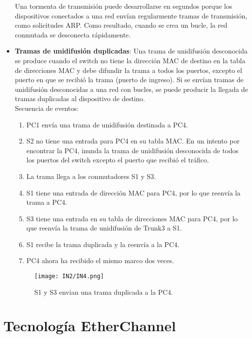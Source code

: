 \documentclass[
	12pt, %
	fleqn, %
	a4paper, %
	oneside, %
]{LegrandOrangeBook}
\begin{document}
\begin{itemize}
Una tormenta de transmisión puede desarrollarse en segundos porque los dispositivos conectados a una red envían regularmente tramas de transmisión, como solicitudes ARP. Como resultado, cuando se crea un bucle, la red conmutada se desconecta rápidamente.
\item \textbf{Tramas de unidifusión duplicadas}: Una trama de unidifusión desconocida se produce  cuando el switch no tiene la dirección MAC de destino en la tabla de direcciones MAC y debe difundir la trama a todos los puertos, excepto el  puerto en que se recibió la trama (puerto de ingreso). Si se envían tramas de unidifusión desconocidas a  una red con bucles, se puede producir la llegada de  tramas duplicadas al dispositivo de destino.\\
Secuencia de eventos:
\begin{enumerate}
\item PC1 envía una trama de unidifusión destinada a PC4.
\item S2 no tiene una entrada para PC4 en su tabla MAC. En un intento por encontrar la PC4, inunda la trama de unidifusión desconocida de todos los puertos del switch excepto el puerto que recibió el tráfico.
\item La trama llega a los conmutadores S1 y S3.
\item S1 tiene una entrada de dirección MAC para PC4, por lo que reenvía la trama a PC4.
\item S3 tiene una entrada en su tabla de direcciones MAC para PC4, por lo que reenvía la trama de unidifusión de Trunk3 a S1.
\item S1 recibe la trama duplicada y la reenvía a la PC4.
\item PC4 ahora ha recibido el mismo marco dos veces.
\end{enumerate}
\begin{figure}[H]
\centering
\texttt{[image: IN2/IN4.png]}
\caption{S1 y S3 envian una trama duplicada a la PC4.}
\end{figure}
\end{itemize}
\section{Tecnología EtherChannel}
\end{document}
